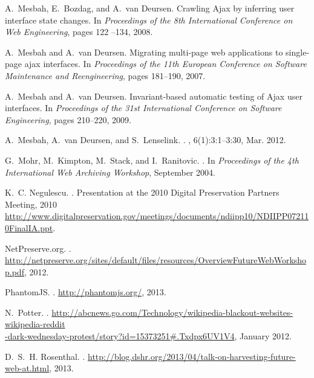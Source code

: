 \documentclass{sig-alternate}
\begin{document}
\begin{thebibliography}{10}
A.~Mesbah, E.~Bozdag, and A.~van Deursen.
\newblock Crawling {A}jax by inferring user interface state changes.
\newblock In {\em Proceedings of the 8th International Conference on Web
  Engineering}, pages 122 --134, 2008.

A.~Mesbah and A.~van Deursen.
\newblock Migrating multi-page web applications to single-page ajax interfaces.
\newblock In {\em Proceedings of the 11th European Conference on Software
  Maintenance and Reengineering}, pages 181--190, 2007.

A.~Mesbah and A.~van Deursen.
\newblock Invariant-based automatic testing of {A}jax user interfaces.
\newblock In {\em Proceedings of the 31st International Conference on Software
  Engineering}, pages 210--220, 2009.

A.~Mesbah, A.~van Deursen, and S.~Lenselink.
.
, 6(1):3:1--3:30, Mar. 2012.

G.~Mohr, M.~Kimpton, M.~Stack, and I.~Ranitovic.
.
\newblock In {\em Proceedings of the 4th International Web Archiving Workshop},
  September 2004.

K.~C. Negulescu.
.
\newblock Presentation at the 2010 Digital Preservation Partners Meeting, 2010
  \url{http://www.digitalpreservation.gov/meetings/documents/ndiipp10/NDIIPP072110FinalIA.ppt}.

{NetPreserve.org}.
.
\newblock
  \url{http://netpreserve.org/sites/default/files/resources/OverviewFutureWebWorkshop.pdf},
  2012.

{PhantomJS}.
.
\newblock \url{http://phantomjs.org/}, 2013.

N.~Potter.
.
\newblock
  \url{http://abcnews.go.com/Technology/wikipedia-blackout-websites-wikipedia-reddit}\\\url{-dark-wednesday-protest/story?id=15373251#.Txdpx6UV1V4},
  January 2012.

D.~S.~H. Rosenthal.
.
\newblock
  \url{http://blog.dshr.org/2013/04/talk-on-harvesting-future-web-at.html},
  2013.


\end{thebibliography}
\end{document}
